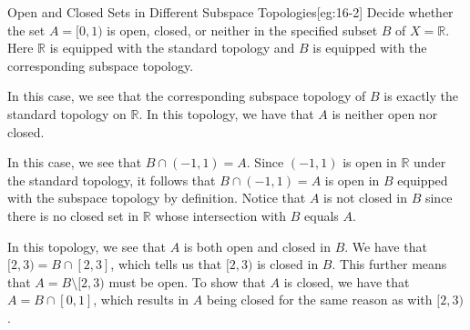 \begin{egBox}{Open and Closed Sets in Different Subspace Topologies}[eg:16-2]
    Decide whether the set \( A = [ 0, 1 ) \) is open, closed, or neither in
    the specified subset \( B \) of \( X = \mathbb{R} \). 
    Here \( \mathbb{R} \) is equipped with the standard topology and \( B \) is 
    equipped with the corresponding subspace topology.

    \baseSkip 

    In this case, we see that the corresponding subspace topology of \( B \) is 
    exactly the standard topology on \( \mathbb{R} \).
    In this topology, we have that \( A \) is neither open nor closed.

    \baseSkip 

    \wrapBox{\( B = [ 0, \infty ) \)}
    In this case, we see that \( B \cap ( -1, 1 ) = A \).
    Since \( ( -1, 1 ) \) is open in \( \mathbb{R} \) under the standard
    topology, it follows that \( B \cap ( -1, 1 ) = A \) is open in \( B \)
    equipped with the subspace topology by definition.
    Notice that \( A \) is not closed in \( B \) since there is no closed set 
    in \( \mathbb{R} \) whose intersection with \( B \) equals \( A \).

    \baseSkip 

    \wrapBox{\( B = [ 0, 1 ) \cup [ 2, 3 ) \)}
    In this topology, we see that \( A \) is both open and closed in \( B \).
    We have that \( [ 2, 3 ) = B \cap [ 2, 3 ] \), which tells us that
    \( [ 2, 3 ) \) is closed in \( B \).
    This further means that \( A = B \setminus [ 2, 3 ) \) must be open.
    To show that \( A \) is closed, we have that \( A = B \cap [ 0, 1 ] \),
    which results in \( A \) being closed for the same reason as with 
    \( [ 2, 3 ) \).
\end{egBox}

